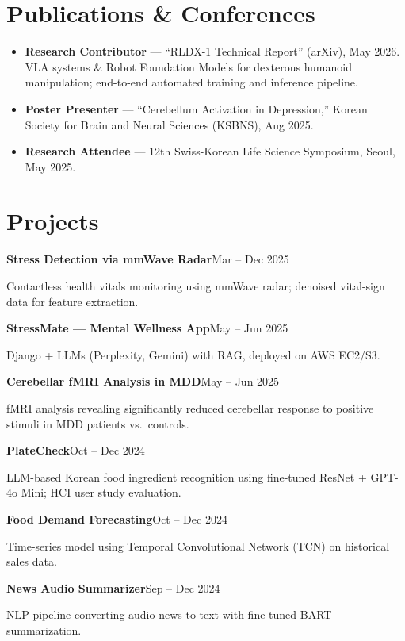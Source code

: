 \documentclass[10pt]{article}
\newcommand{\entry}[2]{\textbf{#1}\hfill{\color{muted}#2}\par}
\begin{document}
\section{Publications \& Conferences}
\begin{itemize}
    \item \textbf{Research Contributor} --- ``RLDX-1 Technical Report'' (arXiv), May 2026. VLA systems \& Robot Foundation Models for dexterous humanoid manipulation; end-to-end automated training and inference pipeline.
    \item \textbf{Poster Presenter} --- ``Cerebellum Activation in Depression,'' Korean Society for Brain and Neural Sciences (KSBNS), Aug 2025.
    \item \textbf{Research Attendee} --- 12th Swiss-Korean Life Science Symposium, Seoul, May 2025.
\end{itemize}

\section{Projects}
\entry{Stress Detection via mmWave Radar}{Mar -- Dec 2025}
Contactless health vitals monitoring using mmWave radar; denoised vital-sign data for feature extraction.\par
\vspace{1pt}
\entry{StressMate --- Mental Wellness App}{May -- Jun 2025}
Django + LLMs (Perplexity, Gemini) with RAG, deployed on AWS EC2/S3.\par
\vspace{1pt}
\entry{Cerebellar fMRI Analysis in MDD}{May -- Jun 2025}
fMRI analysis revealing significantly reduced cerebellar response to positive stimuli in MDD patients vs.\ controls.\par
\vspace{1pt}
\entry{PlateCheck}{Oct -- Dec 2024}
LLM-based Korean food ingredient recognition using fine-tuned ResNet + GPT-4o Mini; HCI user study evaluation.\par
\vspace{1pt}
\entry{Food Demand Forecasting}{Oct -- Dec 2024}
Time-series model using Temporal Convolutional Network (TCN) on historical sales data.\par
\vspace{1pt}
\entry{News Audio Summarizer}{Sep -- Dec 2024}
NLP pipeline converting audio news to text with fine-tuned BART summarization.\par
\end{document}

